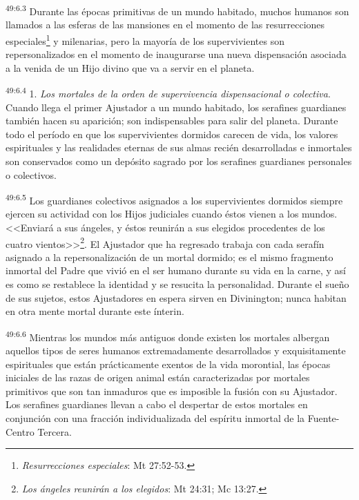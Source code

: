 \par
\textsuperscript{49:6.3} Durante las épocas primitivas de un mundo habitado, muchos humanos son llamados a las esferas de las mansiones en el momento de las resurrecciones especiales\footnote{\textit{Resurrecciones especiales}: Mt 27:52-53.} y milenarias, pero la mayoría de los supervivientes son repersonalizados en el momento de inaugurarse una nueva dispensación asociada a la venida de un Hijo divino que va a servir en el planeta.

\par
\textsuperscript{49:6.4} 1. \textit{Los mortales de la orden de supervivencia dispensacional o colectiva}. Cuando llega el primer Ajustador a un mundo habitado, los serafines guardianes también hacen su aparición; son indispensables para salir del planeta. Durante todo el período en que los supervivientes dormidos carecen de vida, los valores espirituales y las realidades eternas de sus almas recién desarrolladas e inmortales son conservados como un depósito sagrado por los serafines guardianes personales o colectivos.

\par
\textsuperscript{49:6.5} Los guardianes colectivos asignados a los supervivientes dormidos siempre ejercen su actividad con los Hijos judiciales cuando éstos vienen a los mundos. <<Enviará a sus ángeles, y éstos reunirán a sus elegidos procedentes de los cuatro vientos>>\footnote{\textit{Los ángeles reunirán a los elegidos}: Mt 24:31; Mc 13:27.}. El Ajustador que ha regresado trabaja con cada serafín asignado a la repersonalización de un mortal dormido; es el mismo fragmento inmortal del Padre que vivió en el ser humano durante su vida en la carne, y así es como se restablece la identidad y se resucita la personalidad. Durante el sueño de sus sujetos, estos Ajustadores en espera sirven en Divinington; nunca habitan en otra mente mortal durante este ínterin.

\par
\textsuperscript{49:6.6} Mientras los mundos más antiguos donde existen los mortales albergan aquellos tipos de seres humanos extremadamente desarrollados y exquisitamente espirituales que están prácticamente exentos de la vida morontial, las épocas iniciales de las razas de origen animal están caracterizadas por mortales primitivos que son tan inmaduros que es imposible la fusión con su Ajustador. Los serafines guardianes llevan a cabo el despertar de estos mortales en conjunción con una fracción individualizada del espíritu inmortal de la Fuente-Centro Tercera.

